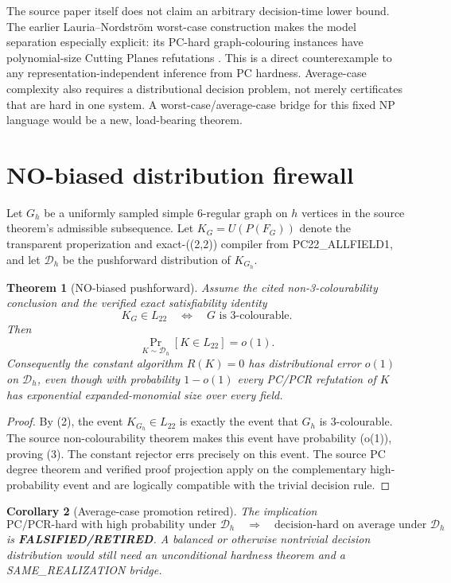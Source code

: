 \documentclass[11pt]{article}
\newtheorem{theorem}{Theorem}
\newtheorem{corollary}[theorem]{Corollary}
\newcommand{\RET}{\textbf{FALSIFIED/RETIRED}}
\newcommand{\Ltwo}{L_{22}}
\begin{document}
The source paper itself does not claim an arbitrary decision-time lower bound.
The earlier Lauria--Nordstr\"om worst-case construction makes the model
separation especially explicit: its PC-hard graph-colouring instances have
polynomial-size Cutting Planes refutations \cite{lauria}.  This is a direct
counterexample to any representation-independent inference from PC hardness.
Average-case complexity also requires a distributional decision problem, not
merely certificates that are hard in one system.  A worst-case/average-case
bridge for this fixed NP language would be a new, load-bearing theorem.

\section{NO-biased distribution firewall}
Let \(G_h\) be a uniformly sampled simple 6-regular graph on \(h\) vertices in
the source theorem's admissible subsequence.  Let \(K_G=U(P(F_G))\) denote the
transparent properization and exact-((2,2)) compiler from PC22\_ALLFIELD1,
and let \(\mathcal D_h\) be the pushforward distribution of \(K_{G_h}\).

\begin{theorem}[NO-biased pushforward]
Assume the cited non-3-colourability conclusion and the verified exact
satisfiability identity
\[
                 K_G\in\Ltwo\quad\Longleftrightarrow\quad
                 G\text{ is 3-colourable}.                \tag{2}
\]
Then
\[
          \Pr_{K\sim\mathcal D_h}[K\in\Ltwo]=o(1).         \tag{3}
\]
Consequently the constant algorithm \(R(K)=0\) has distributional error
\(o(1)\) on \(\mathcal D_h\), even though with probability \(1-o(1)\) every
PC/PCR refutation of \(K\) has exponential expanded-monomial size over every
field.
\end{theorem}
\begin{proof}
By (2), the event \(K_{G_h}\in\Ltwo\) is exactly the event that \(G_h\) is
3-colourable.  The source non-colourability theorem makes this event have
probability (o(1)), proving (3).  The constant rejector errs precisely on
this event.  The source PC degree theorem and verified proof projection apply
on the complementary high-probability event and are logically compatible
with the trivial decision rule.
\end{proof}

\begin{corollary}[Average-case promotion retired]
The implication
\[
 \text{PC/PCR-hard with high probability under }\mathcal D_h
 \quad\Longrightarrow\quad
 \text{decision-hard on average under }\mathcal D_h
\]
is \RET{}.  A balanced or otherwise nontrivial decision distribution would
still need an unconditional hardness theorem and a SAME\_REALIZATION bridge.
\end{corollary}
\end{document}
